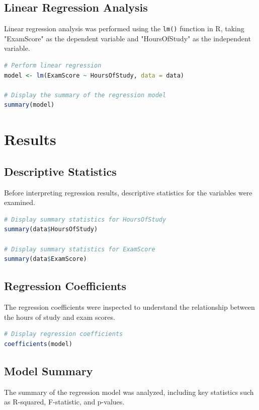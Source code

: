 \documentclass[10pt]{book}
\begin{document}
\subsection{Linear Regression Analysis}

Linear regression analysis was performed using the \texttt{lm()} function in R, taking "ExamScore" as the dependent variable and "HoursOfStudy" as the independent variable.

\begin{lstlisting}[language=R]
# Perform linear regression
model <- lm(ExamScore ~ HoursOfStudy, data = data)

# Display the summary of the regression model
summary(model)
\end{lstlisting}

\section{Results}

\subsection{Descriptive Statistics}

Before interpreting regression results, descriptive statistics for the variables were examined.

\begin{lstlisting}[language=R]
# Display summary statistics for HoursOfStudy
summary(data$HoursOfStudy)

# Display summary statistics for ExamScore
summary(data$ExamScore)
\end{lstlisting}

\subsection{Regression Coefficients}

The regression coefficients were inspected to understand the relationship between the hours of study and exam scores.

\begin{lstlisting}[language=R]
# Display regression coefficients
coefficients(model)
\end{lstlisting}

\subsection{Model Summary}

The summary of the regression model was analyzed, including key statistics such as R-squared, F-statistic, and p-values.
\end{document}
